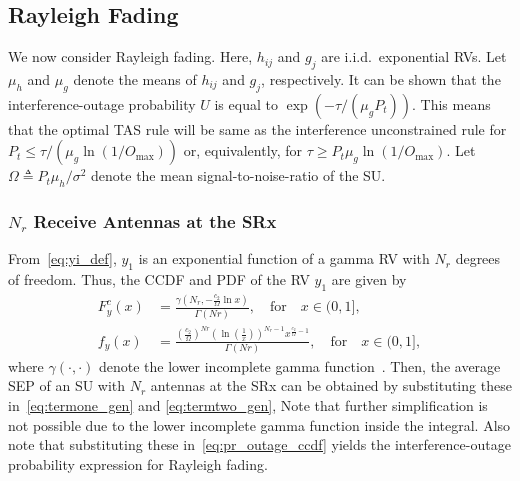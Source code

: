 \documentclass[12pt,draftcls,peerreview,onecolumn]{IEEEtran}
\newcommand{\define}{\triangleq}
\newcommand{\mug}{{\mu_{g}}}
\newcommand{\muh}{{\mu_{h}}}
\newcommand{\Nr}{{N_r}}
\newcommand{\Pt}{{P_t}}
\newcommand{\such}{h}
\newcommand{\puch}{g}
\newcommand{\gk}[1]{{\puch_{#1}}}
\newcommand{\hij}{{\such_{ij}}}
\newcommand{\noisevar}{\sigma^2}
\newcommand{\outmax}{O_{\text{max}}}
\newcommand{\itau}{\tau}
\newcommand{\ctwo}{c_{2}}
\newcommand{\yk}[1]{y_{#1}}
\newcommand{\inlccdfg}[1][]{\exp\left({-{{#1}\itau}/{\left( \mug\Pt\right) }}\right)}
\newcommand{\al}{\ctwo}
\newcommand{\snr}{\Omega}
\newcommand{\albysnr}[1][]{\frac{\al#1}{\snr}}
\newcommand{\un}{U}
\newcommand{\ccdfyNr}[1]{\frac{\gamma\left(\Nr,-\albysnr\ln{#1}\right)}{\Gamma\left(Nr\right)}}
\newcommand{\pdfyNr}{\frac{\left(\albysnr\right)^{Nr}\left(\ln\left(\frac{1}{x}\right)\right)^{\Nr-1}x^{\albysnr[]-1}}{\Gamma(Nr)}} %
\newcommand{\pdfyNrgen}[1]{f_{y}\left(#1\right)} %
\newcommand{\ccdfy}[1]{F^{c}_{y}\left(#1 \right)}
\begin{document}
\subsection{Rayleigh Fading}
We now consider Rayleigh fading. Here, $\hij$ and $\gk{j}$ are i.i.d.\ exponential RVs. Let $\muh$ and $\mug$ denote the means of $\hij$ and $\gk{j}$, respectively. It can be shown that the interference-outage probability $\un$ is equal to $\inlccdfg[]$. This means that the optimal TAS rule will be same as the interference unconstrained rule for $\Pt\leq {\tau}/{\left(\mug\ln\left(1/\outmax\right)\right)}$ or, equivalently, for $\itau\geq\Pt\mug\ln\left(1/\outmax\right)$.  Let $\snr\define\Pt\muh/\noisevar$ denote the mean signal-to-noise-ratio of the SU.
\subsubsection{$\Nr$ Receive Antennas at the SRx} From~\eqref{eq:yi_def}, $\yk{1}$ is an exponential function of a gamma RV with $\Nr$ degrees of freedom. Thus, the CCDF and PDF of the RV $\yk{1}$ are given by 
\begin{align}
\label{eq:ccdfyNr}
\ccdfy{x} &= \ccdfyNr{x}, \quad \text{for} \quad x \in (0,1],\\
\label{eq:pdfyNr}
\pdfyNrgen{x} &= \pdfyNr, \quad \text{for} \quad x \in (0,1],
\end{align}
where $\gamma(\cdot,\cdot)$ denote the lower incomplete gamma function~\cite[(8.350.1)]{gradshteyn00_book}. Then, the average SEP of an SU with $\Nr$ antennas at the SRx can be obtained by substituting these in~\eqref{eq:termone_gen} and \eqref{eq:termtwo_gen}, Note that further simplification is not possible due to the lower incomplete gamma function inside the integral. Also note that substituting these in~\eqref{eq:pr_outage_ccdf} yields the interference-outage probability expression for Rayleigh fading.
%
\end{document}
